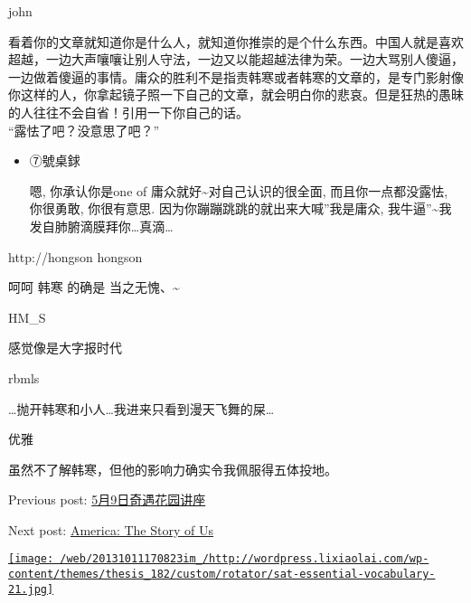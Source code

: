 john

看着你的文章就知道你是什么人，就知道你推崇的是个什么东西。中国人就是喜欢超越，一边大声嚷嚷让别人守法，一边又以能超越法律为荣。一边大骂别人傻逼，一边做着傻逼的事情。庸众的胜利不是指责韩寒或者韩寒的文章的，是专门影射像你这样的人，你拿起镜子照一下自己的文章，就会明白你的悲哀。但是狂热的愚昧的人往往不会自省！引用一下你自己的话。\\
``露怯了吧？没意思了吧？''

\begin{itemize}[<+->]
\item
  ⑦號桌銶

  嗯, 你承认你是one of 庸众就好\textasciitilde{}对自己认识的很全面,
  而且你一点都没露怯, 你很勇敢, 你很有意思.
  因为你蹦蹦跳跳的就出来大喊''我是庸众,
  我牛逼''\textasciitilde{}我发自肺腑滴膜拜你\ldots{}真滴\ldots{}
\end{itemize}

http://hongson hongson

呵呵 韩寒 的确是 当之无愧、\textasciitilde{}

HM\_S

感觉像是大字报时代

rbmls

\ldots{}抛开韩寒和小人\ldots{}我进来只看到漫天飞舞的屎\ldots{}

优雅

虽然不了解韩寒，但他的影响力确实令我佩服得五体投地。

Previous post:
\href{/web/20131011170823/http://wordpress.lixiaolai.com/archives/9332.html}{5月9日奇遇花园讲座}

Next post:
\href{/web/20131011170823/http://wordpress.lixiaolai.com/archives/9346.html}{America:
The Story of Us}

\href{/web/20131011170823/http://product.dangdang.com/product.aspx?product\_id=22741868}{\texttt{[image: /web/20131011170823im\_/http://wordpress.lixiaolai.com/wp-content/themes/thesis\_182/custom/rotator/sat-essential-vocabulary-21.jpg]}}

